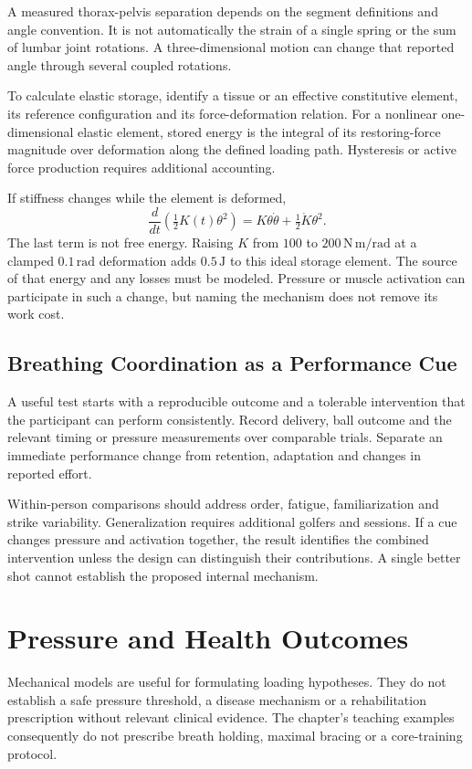 A measured thorax-pelvis separation depends on the segment definitions and angle convention. It is not automatically the strain of a single spring or the sum of lumbar joint rotations. A three-dimensional motion can change that reported angle through several coupled rotations.

To calculate elastic storage, identify a tissue or an effective constitutive element, its reference configuration and its force-deformation relation. For a nonlinear one-dimensional elastic element, stored energy is the integral of its restoring-force magnitude over deformation along the defined loading path. Hysteresis or active force production requires additional accounting.

If stiffness changes while the element is deformed,
\[
\frac{d}{dt}\left(\tfrac12K(t)\theta^2\right)
=K\theta\dot\theta+\tfrac12\dot K\theta^2.
\]
The last term is not free energy. Raising $K$ from $100$ to $200\,\mathrm{N\,m/rad}$ at a clamped $0.1\,\mathrm{rad}$ deformation adds $0.5\,\mathrm J$ to this ideal storage element. The source of that energy and any losses must be modeled. Pressure or muscle activation can participate in such a change, but naming the mechanism does not remove its work cost.

\subsection{Breathing Coordination as a Performance Cue}

A useful test starts with a reproducible outcome and a tolerable intervention that the participant can perform consistently. Record delivery, ball outcome and the relevant timing or pressure measurements over comparable trials. Separate an immediate performance change from retention, adaptation and changes in reported effort.

Within-person comparisons should address order, fatigue, familiarization and strike variability. Generalization requires additional golfers and sessions. If a cue changes pressure and activation together, the result identifies the combined intervention unless the design can distinguish their contributions. A single better shot cannot establish the proposed internal mechanism.

\section{Pressure and Health Outcomes}
\label{sec:iap_risks}

Mechanical models are useful for formulating loading hypotheses. They do not establish a safe pressure threshold, a disease mechanism or a rehabilitation prescription without relevant clinical evidence. The chapter's teaching examples consequently do not prescribe breath holding, maximal bracing or a core-training protocol.

